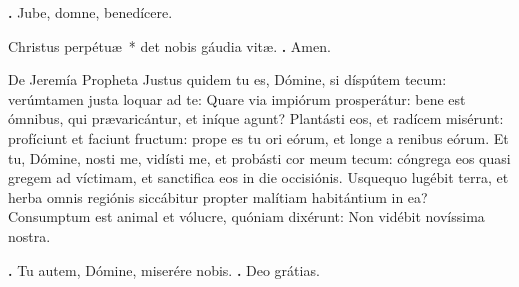 \begin{small}
\textbf{\Vbar.} Jube, domne, benedícere.

Christus perpétuæ~* det nobis gáudia vitæ. \textbf{\Rbar.} Amen.
\end{small}


De Jeremía Propheta
Justus quidem tu es, Dómine, si díspútem tecum: verúmtamen justa loquar ad te: Quare via impiórum prosperátur: bene est ómnibus, qui prævaricántur, et iníque agunt?
Plantásti eos, et radícem misérunt: profíciunt et faciunt fructum: prope es tu ori eórum, et longe a renibus eórum.
Et tu, Dómine, nosti me, vidísti me, et probásti cor meum tecum: cóngrega eos quasi gregem ad víctimam, et sanctifica eos in die occisiónis.
Usquequo lugébit terra, et herba omnis regiónis siccábitur propter malítiam habitántium in ea? Consumptum est animal et vólucre, quóniam dixérunt: Non vidébit novíssima nostra.

\textbf{\Vbar.} Tu autem, Dómine, miserére nobis.
\textbf{\Rbar.} Deo grátias.

